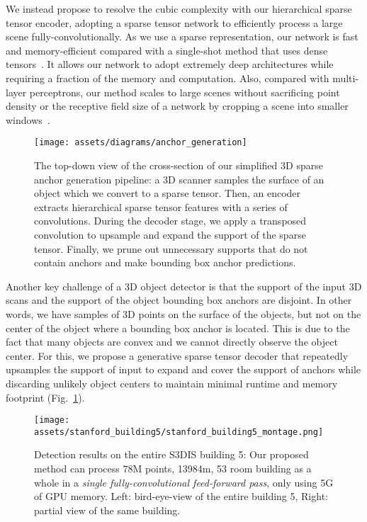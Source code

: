\documentclass[runningheads]{llncs}
\begin{document}
We instead propose to resolve the cubic complexity with our hierarchical sparse tensor encoder, adopting a sparse tensor network to efficiently process a large scene fully-convolutionally. As we use a sparse representation, our network is fast and memory-efficient compared with a single-shot method that uses dense tensors~\cite{hou20193d}. It allows our network to adopt extremely deep architectures while requiring a fraction of the memory and computation.
Also, compared with multi-layer perceptrons, our method scales to large scenes without sacrificing point density or the receptive field size of a network by cropping a scene into smaller windows~\cite{qi2019deep,yang2019learning}. 

\begin{figure}[t]
    \centering
    \small
    \texttt{[image: assets/diagrams/anchor\_generation]}
    \caption{The top-down view of the cross-section of our simplified 3D sparse anchor generation pipeline: a 3D scanner samples the surface of an object which we convert to a sparse tensor. Then, an encoder extracts hierarchical sparse tensor features with a series of convolutions. During the decoder stage, we apply a transposed convolution to upsample and expand the support of the sparse tensor. Finally, we prune out unnecessary supports that do not contain anchors and make bounding box anchor predictions.}
    \label{fig:anchor_generation}
    \vspace{-1em}
\end{figure}

Another key challenge of a 3D object detector is that the support of the input 3D scans and the support of the object bounding box anchors are disjoint. In other words, we have samples of 3D points on the surface of the objects, but not on the center of the object where a bounding box anchor is located. This is due to the fact that many objects are convex and we cannot directly observe the object center. For this, we propose a generative sparse tensor decoder that repeatedly upsamples the support of input to expand and cover the support of anchors while discarding unlikely object centers to maintain minimal runtime and memory footprint (Fig.~\ref{fig:anchor_generation}).



\begin{figure}[t]
    \centering
    \texttt{[image: assets/stanford\_building5/stanford\_building5\_montage.png]}
    \caption{Detection results on the entire S3DIS building 5: Our proposed method can process 78M points, 13984m, 53 room building as a whole in a \textit{single fully-convolutional feed-forward pass}, only using 5G of GPU memory. Left: bird-eye-view of the entire building 5, Right: partial view of the same building.}
    \label{fig:stanford_full}
    \vspace{-1em}
\end{figure}
\end{document}
